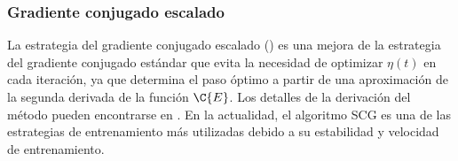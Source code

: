 %
\subsubsection{Gradiente conjugado escalado}
%
La estrategia del gradiente conjugado escalado () \cite{scg} es una mejora de la estrategia del
gradiente conjugado estándar que evita la necesidad de optimizar
$\eta(t)$ en cada iteración, ya que determina el paso óptimo a partir
de una aproximación de la segunda derivada de la función $\C{E}$.
Los detalles de la derivación del método pueden encontrarse en
\cite{scg}.
En la actualidad, el algoritmo SCG es una de las estrategias de
entrenamiento más utilizadas debido a su estabilidad y velocidad de
entrenamiento.
